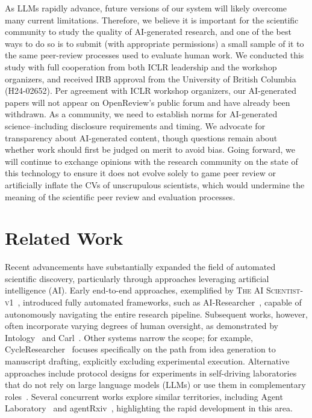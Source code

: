 \documentclass[11pt, a4paper]{include/gdm_format}
\newcommand{\oldalgo}{\textsc{The AI Scientist-v1}\xspace}
\begin{document}
As LLMs rapidly advance, future versions of our system will likely overcome many current limitations.
Therefore, we believe it is important for the scientific community to study the quality of AI-generated research, and one of the best ways to do so is to submit (with appropriate permissions) a small sample of it to the same peer-review processes used to evaluate human work.
We conducted this study with full cooperation from both ICLR leadership and the workshop organizers, and received IRB approval from the University of British Columbia (H24-02652).
Per agreement with ICLR workshop organizers, our AI-generated papers will not appear on OpenReview's public forum and have already been withdrawn.
As a community, we need to establish norms for AI-generated science--including disclosure requirements and timing. 
We advocate for transparency about AI-generated content, though questions remain about whether work should first be judged on merit to avoid bias.
Going forward, we will continue to exchange opinions with the research community on the state of this technology to ensure it does not evolve solely to game peer review or artificially inflate the CVs of unscrupulous scientists, which would undermine the meaning of the scientific peer review and evaluation processes.

\section{Related Work}

Recent advancements have substantially expanded the field of automated scientific discovery, particularly through approaches leveraging artificial intelligence (AI).
Early end-to-end approaches, exemplified by \oldalgo~\citep{lu2024ai}, introduced fully automated frameworks, such as AI-Researcher~\citep{AI-Researcher}, capable of autonomously navigating the entire research pipeline. Subsequent works, however, often incorporate varying degrees of human oversight, as demonstrated by Intology~\citep{intology2025zochi} and Carl~\citep{autoscience2025carl}. Other systems narrow the scope; for example, CycleResearcher~\citep{weng2025cycleresearcher} focuses specifically on the path from idea generation to manuscript drafting, explicitly excluding experimental execution. Alternative approaches include protocol designs for experiments in self-driving laboratories that do not rely on large language models (LLMs) or use them in complementary roles~\citep{shi2025hierarchically}. Several concurrent works explore similar territories, including Agent Laboratory~\citep{schmidgall2025agent} and agentRxiv~\citep{schmidgall2025agentrxiv}, highlighting the rapid development in this area.
\end{document}
